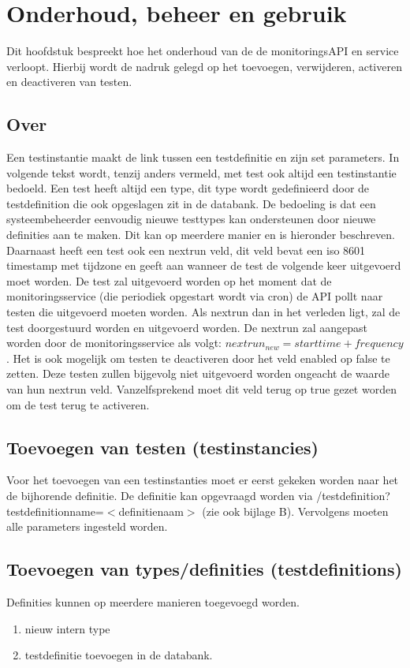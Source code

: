 \chapter{Onderhoud, beheer en gebruik}
{\samenvatting Dit hoofdstuk bespreekt hoe het onderhoud van de de monitoringsAPI en service verloopt. Hierbij wordt de nadruk gelegd op het toevoegen, verwijderen, activeren en deactiveren van testen.}
\npar
\section{Over}
\npar
Een testinstantie maakt de link tussen een testdefinitie en zijn set parameters. In volgende tekst wordt, tenzij anders vermeld, met test ook altijd een testinstantie bedoeld. Een test heeft altijd een type, dit type wordt gedefinieerd door de testdefinition die ook opgeslagen zit in de databank. De bedoeling is dat een systeembeheerder eenvoudig nieuwe testtypes kan ondersteunen door nieuwe definities aan te maken. Dit kan op meerdere manier en is hieronder beschreven.
\npar
Daarnaast heeft een test ook een nextrun veld, dit veld bevat een iso 8601 timestamp met tijdzone en geeft aan wanneer de test de volgende keer uitgevoerd moet worden. De test zal uitgevoerd worden op het moment dat de monitoringsservice (die periodiek opgestart wordt via cron) de API pollt naar testen die uitgevoerd moeten worden. Als nextrun dan in het verleden ligt, zal de test doorgestuurd worden en uitgevoerd worden. De nextrun zal aangepast worden door de monitoringsservice als volgt: $nextrun_{new} = starttime + frequency$.
\npar
Het is ook mogelijk om testen te deactiveren door het veld enabled op false te zetten. Deze testen zullen bijgevolg niet uitgevoerd worden ongeacht de waarde van hun nextrun veld. Vanzelfsprekend moet dit veld terug op true gezet worden om de test terug te activeren.

\section{Toevoegen van testen (testinstancies)}
\npar
Voor het toevoegen van een testinstanties moet er eerst gekeken worden naar het de bijhorende definitie. De definitie kan opgevraagd worden via /testdefinition?testdefinitionname=$<$definitienaam$>$ (zie ook bijlage B). Vervolgens moeten alle parameters ingesteld worden. 

\section{Toevoegen van types/definities (testdefinitions)}
\npar
Definities kunnen op meerdere manieren toegevoegd worden.
\begin{enumerate}
\item nieuw intern type
\item testdefinitie toevoegen in de databank.
\end{enumerate}


